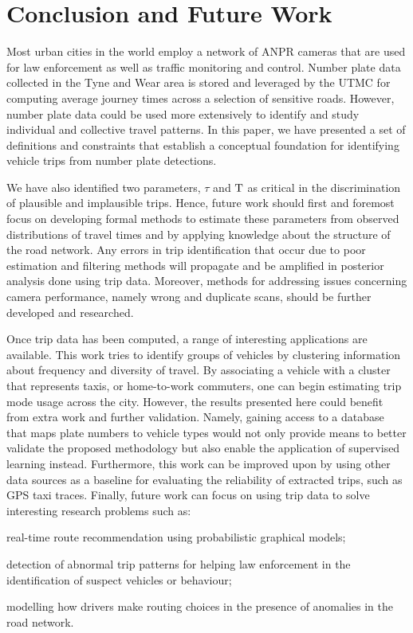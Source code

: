 \section{Conclusion and Future Work}\label{s.conclusions}

Most urban cities in the world employ a network of ANPR cameras that are used for law enforcement as well as traffic monitoring and control. Number plate data collected in the Tyne and Wear area is stored and leveraged by the UTMC for computing average journey times across a selection of sensitive roads. However, number plate data could be used more extensively to identify and study individual and collective travel patterns. In this paper, we have presented a set of definitions and constraints that establish a conceptual foundation for identifying vehicle trips from number plate detections.

We have also identified two parameters, $\tau$ and $\mathrm{T}$ as critical in the discrimination of plausible and implausible trips. Hence, future work should first and foremost focus on developing formal methods to estimate these parameters from observed distributions of travel times and by applying knowledge about the structure of the road network. Any errors in trip identification that occur due to poor estimation and filtering methods will propagate and be amplified in posterior analysis done using trip data. Moreover, methods for addressing issues concerning camera performance, namely wrong and duplicate scans, should be further developed and researched.

Once trip data has been computed, a range of interesting applications are available. This work tries to identify groups of vehicles by clustering information about frequency and diversity of travel. By associating a vehicle with a cluster that represents taxis, or home-to-work commuters, one can begin estimating trip mode usage across the city. However, the results presented here could benefit from extra work and further validation. Namely, gaining access to a database that maps plate numbers to vehicle types would not only provide means to better validate the proposed methodology but also enable the application of supervised learning instead. Furthermore, this work can be improved upon by using other data sources as a baseline for evaluating the reliability of extracted trips, such as GPS taxi traces. Finally, future work can focus on using trip data to solve interesting research problems such as:
\begin{enumerate*}[label=(\roman*)]
  \item real-time route recommendation using probabilistic graphical models;
  \item detection of abnormal trip patterns for helping law enforcement in the identification of suspect vehicles or behaviour;
  \item modelling how drivers make routing choices in the presence of anomalies in the road network.
\end{enumerate*}

